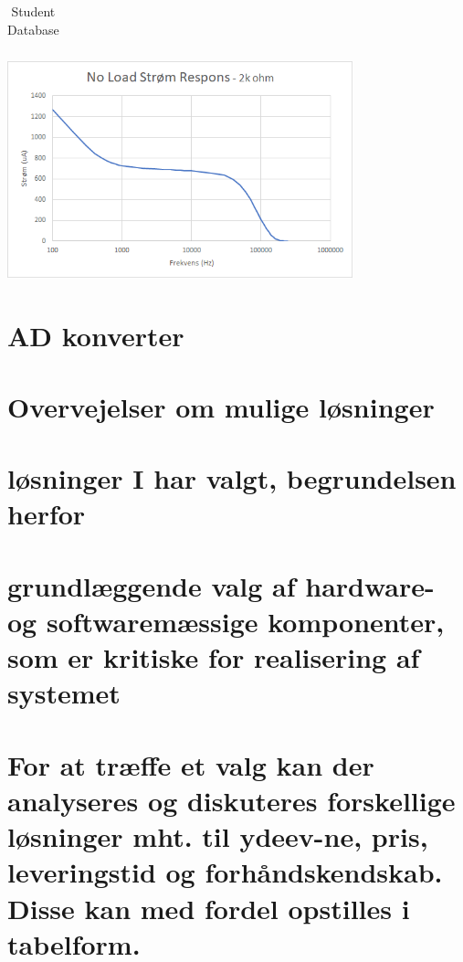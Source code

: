 \documentclass[main.tex]{subfiles}
\begin{document}
\begin{table}[H]
\begin{minipage}[b]{0.30\linewidth}
\begin{tabular}{ r |  r }
\end{tabular}
    \caption{Student Database}
    \label{table:student}
\end{minipage}\hfill
\begin{minipage}[b]{0.7\linewidth}
\centering
\includegraphics[width=10cm]{Figure/stromfrekvensoprindelig2k}
\label{fig:image}
\end{minipage}
\end{table}













\section{AD konverter}
\section{Overvejelser om mulige løsninger}
\section{løsninger I har valgt, begrundelsen herfor}
\section{grundlæggende valg af hardware- og softwaremæssige komponenter, som er kritiske for realisering af systemet}

\section{For at træffe et valg kan der analyseres og diskuteres forskellige løsninger mht. til ydeev-ne, pris, leveringstid og forhåndskendskab. Disse kan med fordel opstilles i tabelform.}
\end{document}
